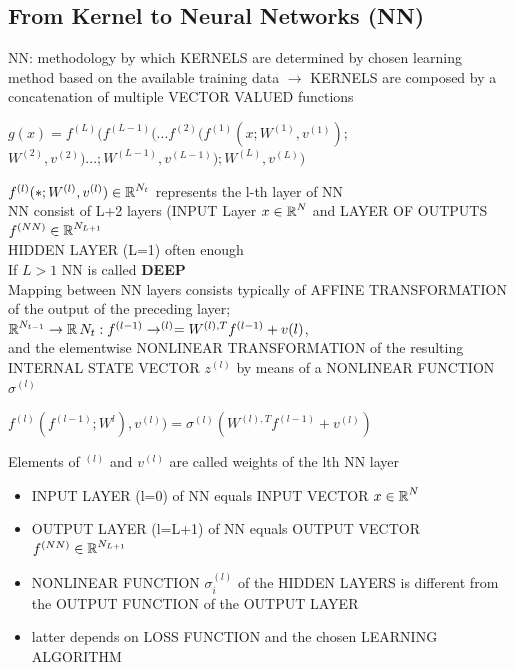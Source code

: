 
\begin{sectionbox}
\subsection{From Kernel to Neural Networks (NN)}
NN: methodology by which KERNELS are determined by chosen learning method based on the available training data $\rightarrow$ KERNELS are composed by a concatenation of multiple VECTOR VALUED functions
\begin{emphbox}
$g(x)=f^{(L)}(f^{(L-1)}(...f^{(2)}(f^{(1)}(x;W^{(1)},v^{(1)});$\\
$W^{(2)},v^{(2)})...;W^{(L-1)},v^{(L-1)});W^{(L)},v^{(L)})$
\end{emphbox}
$f^{(l)}(*;W^{(l)},v^{(l)})\in \operatorname{\mathbb R}^{N_t}$ represents the l-th layer of NN\\
NN consist of L+2 layers (INPUT Layer $x \in \operatorname{\mathbb R}^N$ and LAYER OF OUTPUTS $f^{(NN)}\in \operatorname{\mathbb R}^{N_{L+1}}$\\
HIDDEN LAYER (L=1) often enough\\
If $L>1$ NN is called \textbf{DEEP}\\

Mapping between NN layers consists typically of AFFINE TRANSFORMATION of the output of the preceding layer;\\
$\operatorname{\mathbb R}^{N_{t-1}}\rightarrow \operatorname{\mathbb R}{N_t}:f^{(l-1)} \rightarrow^{(l)}=W^{(l),T}f^{(l-1)}+v{(l)}$,\\
and the elementwise NONLINEAR TRANSFORMATION of the resulting INTERNAL STATE VECTOR $z^{(l)}$ by means of a NONLINEAR FUNCTION $\sigma^{(l)}$\\
\begin{emphbox}
$f^{(l)}(f^{(l-1)};W^{l}),v^{(l)})=\sigma^{(l)}(W^{(l),T}f^{(l-1)}+v^{(l)})$
\end{emphbox}

Elements of $^{(l)}$ and $v^{(l)}$ are called weights of the lth NN layer
\begin{itemize}
\item INPUT LAYER (l=0) of NN equals INPUT VECTOR $x \in \operatorname{\mathbb R}^N$
\item OUTPUT LAYER (l=L+1) of NN equals OUTPUT VECTOR $f^{(NN)}\in \operatorname{\mathbb R}^{N_{L+1}}$
\item NONLINEAR FUNCTION $\sigma_i^{(l)}$ of the HIDDEN LAYERS is different from the OUTPUT FUNCTION of the OUTPUT LAYER
\item latter depends on LOSS FUNCTION and the chosen LEARNING ALGORITHM
\end{itemize}


\end{sectionbox}
